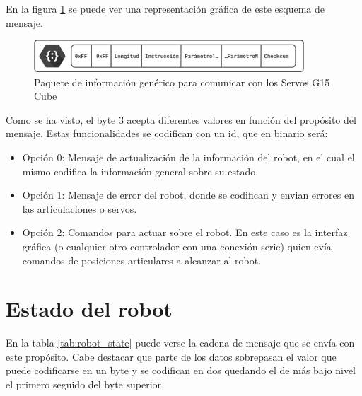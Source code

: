 En la figura \ref{fig:app:comunicacion_brazo:comunicacion_mensaje} se puede ver una representación gráfica de este esquema de mensaje.


\begin{figure}[H]

\centering

\includegraphics[width=0.9\textwidth]{figuras/Imagenes_SW/Packet_From_RobotRHA.jpg}

\caption{Paquete de información genérico para comunicar con los Servos G15 Cube}

\label{fig:app:comunicacion_brazo:comunicacion_mensaje}

\end{figure}


Como se ha visto, el byte 3 acepta diferentes valores en función del propósito del mensaje. Estas funcionalidades se codifican con un id, que en binario será:


\begin{itemize}

\item Opción 0: Mensaje de actualización de la información del robot, en el cual el mismo codifica la información general sobre su estado.

\item Opción 1: Mensaje de error del robot, donde se codifican y envian errores en las articulaciones o servos.

\item Opción 2: Comandos para actuar sobre el robot. En este caso es la interfaz gráfica (o cualquier otro controlador con una conexión serie) quien evía comandos de posiciones articulares a alcanzar al robot.

\end{itemize}


\section{Estado del robot}


En la tabla \ref{tab:robot_state} puede verse la cadena de mensaje que se envía con este propósito. Cabe destacar que parte de los datos sobrepasan el valor que puede codificarse en un byte y se codifican en dos quedando el de más bajo nivel el primero seguido del byte superior.


